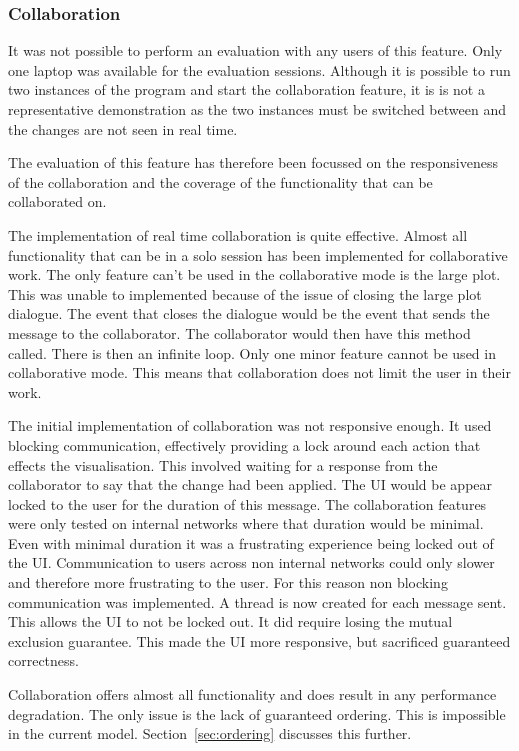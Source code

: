 \subsubsection{Collaboration}

It was not possible to perform an evaluation with any users of this feature.  Only one laptop was available for the evaluation sessions.  Although it is possible to run two instances of the program and start the collaboration feature, it is is not a representative demonstration as the two instances must be switched between and the changes are not seen in real time.

The evaluation of this feature has therefore been focussed on the responsiveness of the collaboration and the coverage of the functionality that can be collaborated on.

The implementation of real time collaboration is quite effective.  Almost all functionality that can be in a solo session has been implemented for collaborative work.  The only feature can't be used in the collaborative mode is the large plot. This was unable to implemented because of the issue of closing the large plot dialogue.  The event that closes the dialogue would be the event that sends the message to the collaborator.  The collaborator would then have this method called.  There is then an infinite loop.  Only one minor feature cannot be used in collaborative mode.  This means that collaboration does not limit the user in their work.

The initial implementation of collaboration was not responsive enough.  It used blocking communication, effectively providing a lock around each action that effects the visualisation.  This involved waiting for a response from the collaborator to say that the change had been applied.  The \ac{UI} would be appear locked to the user for the duration of this message.  The collaboration features were only tested on internal networks where that duration would be minimal.  Even with minimal duration it was a frustrating experience being locked out of the \ac{UI}.  Communication to users across non internal networks could only slower and therefore more frustrating to the user.  For this reason non blocking communication was implemented.  A thread is now created for each message sent.  This allows the \ac{UI} to not be locked out.  It did require losing the mutual exclusion guarantee.  This made the \ac{UI} more responsive, but sacrificed guaranteed correctness.

Collaboration offers almost all functionality and does result in any performance degradation.  The only issue is the lack of guaranteed ordering.  This is impossible in the current model.  Section~\ref{sec:ordering} discusses this further.

